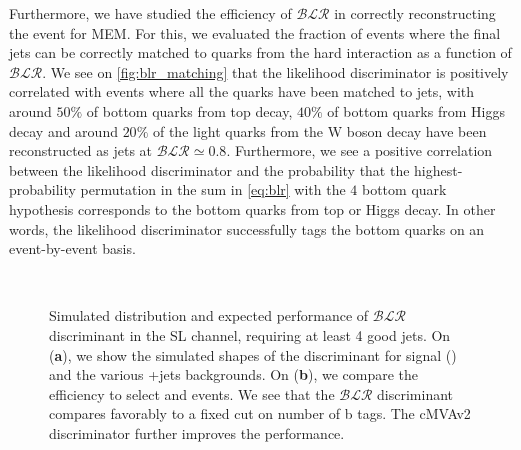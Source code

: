 Furthermore, we have studied the efficiency of $\mathcal{BLR}$ in correctly reconstructing the event for MEM. For this, we evaluated the fraction of events where the final jets can be correctly matched to quarks from the hard interaction as a function of $\mathcal{BLR}$. We see on \cref{fig:blr_matching} that the likelihood discriminator is positively correlated with events where all the quarks have been matched to jets, with around $50\%$ of bottom quarks from top decay, $40\%$ of bottom quarks from Higgs decay and around $20\%$ of the light quarks from the W boson decay have been reconstructed as jets at $\mathcal{BLR} \simeq 0.8$. Furthermore, we see a positive correlation between the likelihood discriminator and the probability that the highest-probability permutation in the sum in \cref{eq:blr} with the $4$ bottom quark hypothesis corresponds to the bottom quarks from top or Higgs decay. In other words, the likelihood discriminator successfully tags the bottom quarks on an event-by-event basis.

\begin{figure}
\begin{centering}
\\
\caption{Simulated distribution and expected performance of $\mathcal{BLR}$ discriminant in the SL channel, requiring at least 4 good jets. On (\textbf{a}), we show the simulated shapes of the discriminant for signal (\ttHbb) and the various \ttbar+jets backgrounds. On (\textbf{b}), we compare the efficiency to select \ttHbb and \ttlf events. We see that the $\mathcal{BLR}$ discriminant compares favorably to a fixed cut on number of b tags. The cMVAv2 discriminator further improves the performance.}
\label{fig:blr_discrimination}
\end{centering}
\end{figure}


